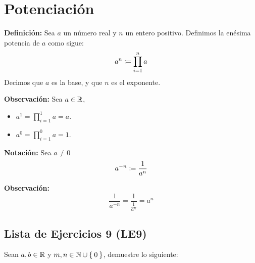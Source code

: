 \section*{Potenciación}

\textbf{Definición:} Sea $a$ un número real y $n$ un entero positivo. Definimos la enésima potencia de $a$ como sigue:
\[a^n \coloneqq \prod_{i=1}^{n} a\]
Decimos que $a$ es la base, y que $n$ es el exponente.

\textbf{Observación:} Sea $a\in \mathbb{R}$,
\vspace{-1em}\begin{itemize}
  \item $a^1= \prod_{i=1}^{1} a = a$.
  \item $a^0 = \prod_{i=1}^{0} a = 1$.%
\end{itemize}\vspace{-1em}

\textbf{Notación:} Sea $a\neq 0$ \[a^{-n}\coloneqq \frac{1}{a^n}\]

\textbf{Observación:} \[\frac{1}{a^{-n}} = \frac{1}{\frac{1}{a^n}} = a^n\]

\subsection*{Lista de Ejercicios 9 (LE9)}

Sean $a,b\in \mathbb{R}$ y $m, n\in \mathbb{N}\cup\Set{0}$, demuestre lo siguiente:

